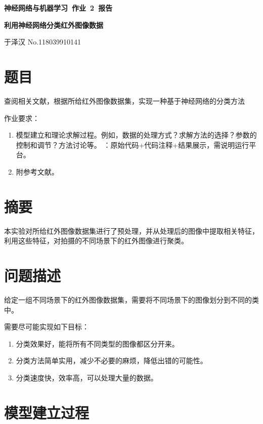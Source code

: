 \documentclass[a4paper, 12pt]{article}
\begin{document}
\begin{center}
{\bfseries {神经网络与机器学习~作业~2~报告}}

{\bfseries {利用神经网络分类红外图像数据}}

\vspace{0.5\baselineskip}

{ \kaishu 于泽汉 \hspace{1em} \textsf{No.118039910141}}
\end{center}


\section{题目}

查阅相关文献，根据所给红外图像数据集，实现一种基于神经网络的分类方法

作业要求：
\begin{enumerate}[leftmargin=*,labelindent=2em]
\item 模型建立和理论求解过程。例如，数据的处理方式？求解方法的选择？参数的控制和调节？方法讨论等。 
：原始代码+代码注释+结果展示，需说明运行平台。
\item 附参考文献。
\end{enumerate}


\section{摘要}
本实验对所给红外图像数据集进行了预处理，并从处理后的图像中提取相关特征，利用这些特征，对拍摄的不同场景下的红外图像进行聚类。


\section{问题描述}

给定一组不同场景下的红外图像数据集，需要将不同场景下的图像划分到不同的类中。

需要尽可能实现如下目标：

\begin{enumerate}[leftmargin=*,labelindent=2em]
\item 分类效果好，能将所有不同类型的图像都区分开来。
\item 分类方法简单实用，减少不必要的麻烦，降低出错的可能性。
\item 分类速度快，效率高，可以处理大量的数据。
\end{enumerate}

\section{模型建立过程}
\end{document}
